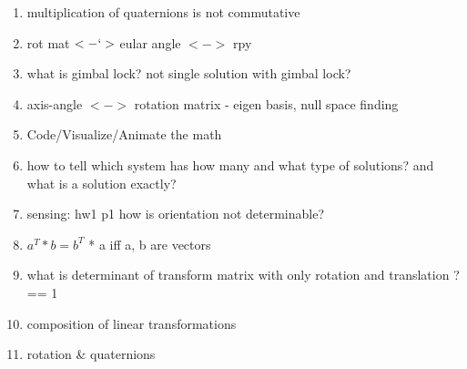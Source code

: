 \documentclass[../main.tex]{subfiles}
\begin{document}
\todo
\begin{enumerate}[nolistsep]
  \item multiplication of quaternions is not commutative
  \item rot mat $<-`>$ eular angle $<->$ rpy
  \item what is gimbal lock? not single solution with gimbal lock?
  \item axis-angle $<->$ rotation matrix - eigen basis, null space finding
  \item Code/Visualize/Animate the math
  \item how to tell which system has how many and what type  of solutions? and what is a solution exactly?
  \item sensing: hw1 p1 how is orientation not determinable?
  \item $a^T * b = b^T$ * a iff a, b are vectors
  \item what is determinant of transform matrix with only rotation and translation ? == 1
  \item composition of linear transformations
  \item rotation \& quaternions
\end{enumerate}
\end{document}
